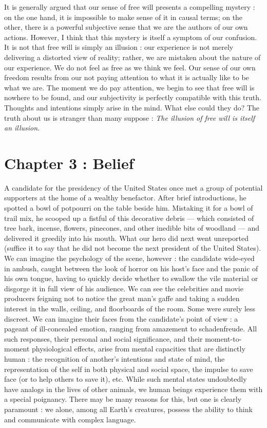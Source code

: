 \documentclass[a4paper,14pt]{extbook}
\begin{document}
It is generally argued that our sense of free will presents a compelling mystery :
on the one hand, it is impossible to make sense of it in causal terms;
on the other, there is a powerful subjective sense that we are the authors of our own actions.
However, I think that this mystery is itself a symptom of our confusion.
It is not that free will is simply an illusion :
our experience is not merely delivering a distorted view of reality;
rather, we are mistaken about the nature of our experience.
We do not feel as free as we think we feel.
Our sense of our own freedom results from our not paying attention to what it is actually like to be what we are.
The moment we do pay attention, we begin to see that free will is nowhere to be found, and our subjectivity is perfectly compatible with this truth.
Thoughts and intentions simply arise in the mind.
What else could they do?
The truth about us is stranger than many suppose :
\textit{The illusion of free will is itself an illusion}.

\newpage
\section{Chapter 3 : Belief}

A candidate for the presidency of the United States once met a group of potential supporters at the home of a wealthy benefactor.
After brief introductions, he spotted a bowl of potpourri on the table beside him.
Mistaking it for a bowl of trail mix, he scooped up a fistful of this decorative debris --- which consisted of tree bark, incense, flowers, pinecones, and other inedible bits of woodland --- and delivered it greedily into his mouth.
What our hero did next went unreported (suffice it to say that he did not become the next president of the United States).
We can imagine the psychology of the scene, however :
the candidate wide-eyed in ambush, caught between the look of horror on his host’s face and the panic of his own tongue, having to quickly decide whether to swallow the vile material or disgorge it in full view of his audience.
We can see the celebrities and movie producers feigning not to notice the great man’s gaffe and taking a sudden interest in the walls, ceiling, and floorboards of the room.
Some were surely less discreet.
We can imagine their faces from the candidate’s point of view :
a pageant of ill-concealed emotion, ranging from amazement to schadenfreude.
All such responses, their personal and social significance, and their moment-to-moment physiological effects, arise from mental capacities that are distinctly human :
the recognition of another’s intentions and state of mind, the representation of the self in both physical and social space, the impulse to save face (or to help others to save it), etc.
While such mental states undoubtedly have analogs in the lives of other animals, we human beings experience them with a special poignancy.
There may be many reasons for this, but one is clearly paramount :
we alone, among all Earth’s creatures, possess the ability to think and communicate with complex language.
\end{document}

